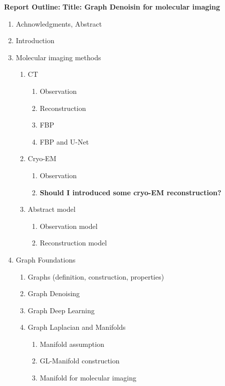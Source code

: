 \textbf{Report Outline:}
\textbf{Title: Graph Denoisin for molecular imaging}
\begin{enumerate}
    \item Achnowledgments, Abstract
    \item Introduction
    \item Molecular imaging methods
    \begin{enumerate}
        \item CT
        \begin{enumerate}
            \item Observation
            \item Reconstruction
            \item FBP
            \item FBP and U-Net
        \end{enumerate}
        \item Cryo-EM
        \begin{enumerate}
            \item Observation
            \item \textbf{Should I introduced some cryo-EM reconstruction?}
        \end{enumerate}
        \item Abstract model
        \begin{enumerate}
            \item Observation model
            \item Reconstruction model
        \end{enumerate}
    \end{enumerate}

    \item Graph Foundations
    \begin{enumerate}
        \item Graphs (definition, construction, properties)
        \item Graph Denoising
        \item Graph Deep Learning
        \item Graph Laplacian and Manifolds
        \begin{enumerate}
            \item Manifold assumption
            \item GL-Manifold construction
            \item Manifold for molecular imaging 
        \end{enumerate}
    \end{enumerate}


\end{enumerate}
